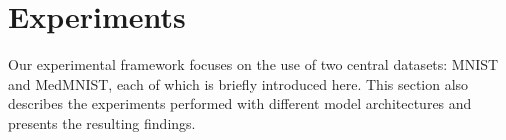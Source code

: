 \section{Experiments}\label{experiments}
Our experimental framework focuses on the use of two central datasets: MNIST and MedMNIST, each of which is briefly introduced here. This section also describes the experiments performed with different model architectures and presents the resulting findings.






